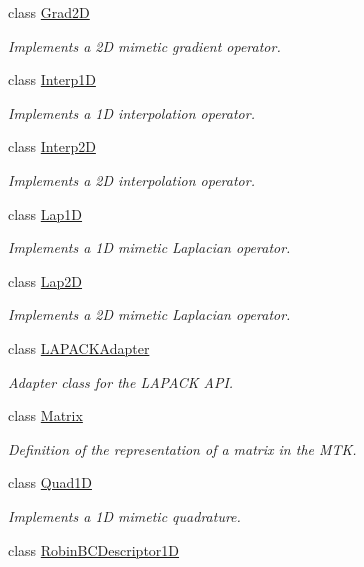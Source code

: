 \begin{DoxyCompactItemize}
class \hyperlink{classmtk_1_1Grad2D}{Grad2\+D}
\begin{DoxyCompactList}\small\item\em Implements a 2\+D mimetic gradient operator. \end{DoxyCompactList}\item 
class \hyperlink{classmtk_1_1Interp1D}{Interp1\+D}
\begin{DoxyCompactList}\small\item\em Implements a 1\+D interpolation operator. \end{DoxyCompactList}\item 
class \hyperlink{classmtk_1_1Interp2D}{Interp2\+D}
\begin{DoxyCompactList}\small\item\em Implements a 2\+D interpolation operator. \end{DoxyCompactList}\item 
class \hyperlink{classmtk_1_1Lap1D}{Lap1\+D}
\begin{DoxyCompactList}\small\item\em Implements a 1\+D mimetic Laplacian operator. \end{DoxyCompactList}\item 
class \hyperlink{classmtk_1_1Lap2D}{Lap2\+D}
\begin{DoxyCompactList}\small\item\em Implements a 2\+D mimetic Laplacian operator. \end{DoxyCompactList}\item 
class \hyperlink{classmtk_1_1LAPACKAdapter}{L\+A\+P\+A\+C\+K\+Adapter}
\begin{DoxyCompactList}\small\item\em Adapter class for the L\+A\+P\+A\+C\+K A\+P\+I. \end{DoxyCompactList}\item 
class \hyperlink{classmtk_1_1Matrix}{Matrix}
\begin{DoxyCompactList}\small\item\em Definition of the representation of a matrix in the M\+T\+K. \end{DoxyCompactList}\item 
class \hyperlink{classmtk_1_1Quad1D}{Quad1\+D}
\begin{DoxyCompactList}\small\item\em Implements a 1\+D mimetic quadrature. \end{DoxyCompactList}\item 
class \hyperlink{classmtk_1_1RobinBCDescriptor1D}{Robin\+B\+C\+Descriptor1\+D}

\end{DoxyCompactItemize}
